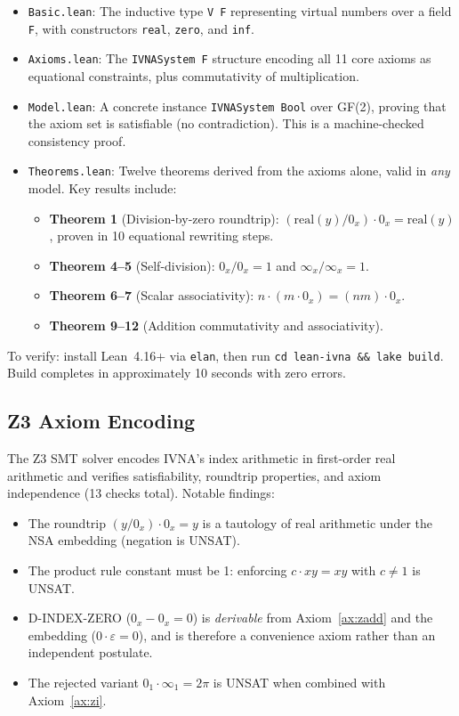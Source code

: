\documentclass[12pt]{article}
\theoremstyle{definition}
\theoremstyle{remark}
\newcommand{\vz}[1]{0_{#1}}             %
\newcommand{\vi}[1]{\infty_{#1}}        %
\begin{document}
\begin{itemize}
\item \texttt{Basic.lean}: The inductive type \texttt{V F} representing
  virtual numbers over a field \texttt{F}, with constructors
  \texttt{real}, \texttt{zero}, and \texttt{inf}.

\item \texttt{Axioms.lean}: The \texttt{IVNASystem F} structure encoding
  all 11 core axioms as equational constraints, plus commutativity
  of multiplication.

\item \texttt{Model.lean}: A concrete instance \texttt{IVNASystem Bool}
  over GF(2), proving that the axiom set is satisfiable (no
  contradiction). This is a machine-checked consistency proof.

\item \texttt{Theorems.lean}: Twelve theorems derived from the axioms
  alone, valid in \emph{any} model. Key results include:
  \begin{itemize}
  \item \textbf{Theorem 1} (Division-by-zero roundtrip):
    $(\text{real}(y) / \vz{x}) \cdot \vz{x} = \text{real}(y)$,
    proven in 10 equational rewriting steps.
  \item \textbf{Theorem 4--5} (Self-division):
    $\vz{x} / \vz{x} = 1$ and $\vi{x} / \vi{x} = 1$.
  \item \textbf{Theorem 6--7} (Scalar associativity):
    $n \cdot (m \cdot \vz{x}) = (nm) \cdot \vz{x}$.
  \item \textbf{Theorem 9--12} (Addition commutativity and associativity).
  \end{itemize}
\end{itemize}

\noindent
To verify: install Lean~4.16+ via \texttt{elan}, then run
\texttt{cd lean-ivna \&\& lake build}. Build completes in approximately
10 seconds with zero errors.

\subsection{Z3 Axiom Encoding}

The Z3 SMT solver encodes IVNA's index arithmetic in first-order
real arithmetic and verifies satisfiability, roundtrip properties,
and axiom independence (13 checks total). Notable findings:

\begin{itemize}
\item The roundtrip $(y / \vz{x}) \cdot \vz{x} = y$ is a tautology
  of real arithmetic under the NSA embedding (negation is UNSAT).
\item The product rule constant must be 1: enforcing
  $c \cdot xy = xy$ with $c \neq 1$ is UNSAT.
\item D-INDEX-ZERO ($\vz{x} - \vz{x} = 0$) is \emph{derivable}
  from Axiom~\ref{ax:zadd} and the embedding ($0 \cdot \varepsilon = 0$),
  and is therefore a convenience axiom rather than an independent postulate.
\item The rejected variant $\vz{1} \cdot \vi{1} = 2\pi$ is UNSAT
  when combined with Axiom~\ref{ax:zi}.
\end{itemize}
\end{document}
